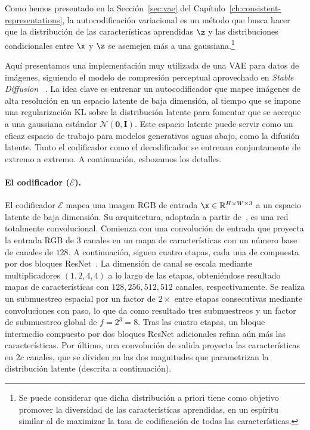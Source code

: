 \documentclass[../../book-main_es.tex]{subfiles}
\begin{document}




\label{sec:VAE-implement}


Como hemos presentado en la Sección~\ref{sec:vae} del Capítulo~\ref{ch:consistent-representations}, 
la autocodificación variacional es un método que busca hacer que la distribución de 
las características aprendidas $\z$ y las distribuciones condicionales entre $\x$ y $\z$ se asemejen 
más a una gaussiana.\footnote{Se puede considerar que dicha distribución a priori 
tiene como objetivo promover la diversidad de las características aprendidas, en un espíritu similar 
al de maximizar la tasa de codificación de todas las características.}

Aquí presentamos una implementación muy utilizada de una VAE para datos de imágenes, siguiendo el 
modelo de compresión perceptual aprovechado en \textit{Stable Diffusion} ~\citep{rombach2022high}. La idea clave 
es entrenar un autocodificador que mapee imágenes de alta resolución en un espacio latente de baja 
dimensión, al tiempo que se impone una regularización KL sobre la distribución latente para fomentar 
que se acerque a una gaussiana estándar $\mathcal{N}(\boldsymbol{0}, \boldsymbol{I})$. Este espacio 
latente puede servir como un eficaz espacio de trabajo para modelos generativos aguas abajo, como 
la difusión latente. Tanto el codificador como el decodificador se entrenan conjuntamente de extremo 
a extremo. A continuación, esbozamos los detalles.

\paragraph{El codificador ($\mathcal{E}$).}
El codificador $\mathcal{E}$ mapea una imagen RGB de entrada $\x \in \mathbb{R}^{H \times W \times 3}$ 
a un espacio latente de baja dimensión. Su arquitectura, adoptada a partir de~\citep{esser2021taming}, es una 
red totalmente convolucional. Comienza con una convolución de entrada que proyecta la entrada RGB de 3 
canales en un mapa de características con un número base de canales de $128$. A continuación, siguen cuatro 
etapas, cada una de compuesta por dos bloques ResNet~\citep{he2016deep}. La dimensión de canal 
se escala mediante multiplicadores $(1, 2, 4, 4)$ a lo largo de las etapas, obteniéndose resultado 
mapas de características con $128, 256, 512, 512$ canales, respectivamente. Se realiza un submuestreo 
espacial por un factor de $2\times$ entre etapas consecutivas mediante convoluciones con paso, lo que 
da como resultado tres submuestreos y un factor de submuestreo global de $f = 2^3 = 8$. Tras las cuatro 
etapas, un bloque intermedio compuesto por dos bloques ResNet adicionales refina aún más las características. 
Por último, una convolución de salida proyecta las características en $2c$ canales, que se dividen en las 
dos magnitudes que parametrizan la distribución latente (descrita a continuación).
\end{document}
